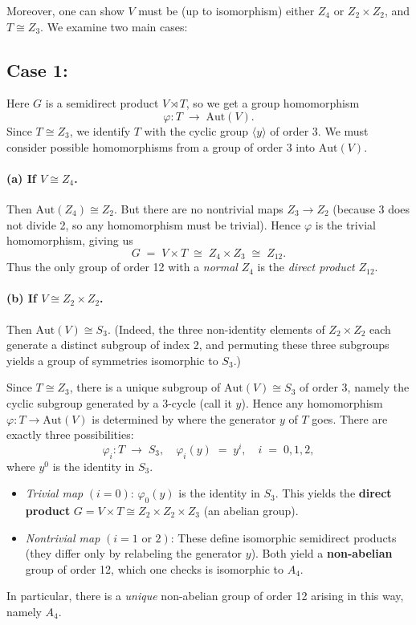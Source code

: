 \documentclass[12pt]{article}
\theoremstyle{definition} %
\theoremstyle{plain} %
\begin{document}
Moreover, one can show $V$ must be (up to isomorphism) either $Z_4$ or $Z_2 \times Z_2$, 
and $T \cong Z_3$.  
We examine two main cases:

\subsection*{Case 1: }

Here $G$ is a semidirect product $V \rtimes T$, so we get a group homomorphism
\[
  \varphi : T \;\longrightarrow\; \mathrm{Aut}(V).
\]
Since $T \cong Z_3$, we identify $T$ with the cyclic group $\langle y\rangle$ of order 3.  
We must consider possible homomorphisms from a group of order 3 into $\mathrm{Aut}(V)$.

\paragraph{(a) If $V \cong Z_4$.} 
Then $\mathrm{Aut}(Z_4) \cong Z_2$.  
But there are no nontrivial maps $Z_3 \to Z_2$ (because 3 does not divide 2, so any homomorphism must be trivial).  
Hence $\varphi$ is the trivial homomorphism, giving us
\[
  G \;=\; V \times T \;\cong\; Z_4 \times Z_3 
  \;\cong\; Z_{12}.
\]
Thus the only group of order 12 with a \emph{normal} $Z_4$ is the \emph{direct product} $Z_{12}$.

\paragraph{(b) If $V \cong Z_2 \times Z_2$.}
Then $\mathrm{Aut}(V) \cong S_3$.  
(Indeed, the three non-identity elements of $Z_2 \times Z_2$ each generate a distinct subgroup of index 2, 
and permuting these three subgroups yields a group of symmetries isomorphic to $S_3$.)

Since $T \cong Z_3$, there is a unique subgroup of $\mathrm{Aut}(V) \cong S_3$ of order 3, namely the cyclic subgroup generated by a 3-cycle (call it $y$).  
Hence any homomorphism $\varphi: T \to \mathrm{Aut}(V)$ is determined by where the generator $y$ of $T$ goes.  
There are exactly three possibilities:
\[
  \varphi_i : T \;\longrightarrow\; S_3,
  \quad 
  \varphi_i(y) \;=\; y^i,
  \quad 
  i \;=\;0,1,2,
\]
where $y^0$ is the identity in $S_3$.

\begin{itemize}
\item \emph{Trivial map} $(i=0)$: \; $\varphi_0(y)$ is the identity in $S_3$.  
  This yields the \textbf{direct product} $G = V \times T \cong Z_2 \times Z_2 \times Z_3$ (an abelian group).
\item \emph{Nontrivial map} $(i=1 \text{ or } 2)$:  
  These define isomorphic semidirect products (they differ only by relabeling the generator $y$).  
  Both yield a \textbf{non-abelian} group of order 12, which one checks is isomorphic to $A_4$. 
\end{itemize}
In particular, there is a \emph{unique} non-abelian group of order 12 arising in this way, namely $A_4$.
\end{document}
